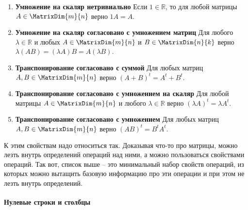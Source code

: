 \begin{enumerate}
\item {\bf Умножение на скаляр нетривиально}
Если $1\in\mathbb R$, то для любой матрицы $A\in \MatrixDim{m}{n}$ верно $1 A = A$.

\item {\bf Умножение на скаляр согласовано с умножением матриц}
Для любого $\lambda \in \mathbb R$ и любых $A\in\MatrixDim{m}{n}$ и $B\in\MatrixDim{n}{k}$ верно $\lambda(AB) = (\lambda A)B = A (\lambda B)$.


\item {\bf Транспонирование согласовано с суммой}
Для любых матриц $A, B\in\MatrixDim{m}{n}$ верно $(A+B)^t = A^t + B^t$.

\item {\bf Транспонирование согласовано с умножением на скаляр}
Для любой матрицы $A\in\MatrixDim{m}{n}$ и любого $\lambda\in\mathbb R$ верно $(\lambda A)^t = \lambda A^t$.

\item {\bf Транспонирование согласовано с умножением}
Для любых матриц $A, B\in\MatrixDim{m}{n}$ верно $(AB)^t = B^t A^t$.
\end{enumerate}

К этим свойствам надо относиться так.
Доказывая что-то про матрицы, можно лезть внутрь определений операций над ними, а можно пользоваться свойствами операций.
Так вот, список выше -- это минимальный набор свойств операций, из которых можно вытащить базовую информацию про эти операции и при этом не лезть внутрь определений.

\paragraph{Нулевые строки и столбцы}

